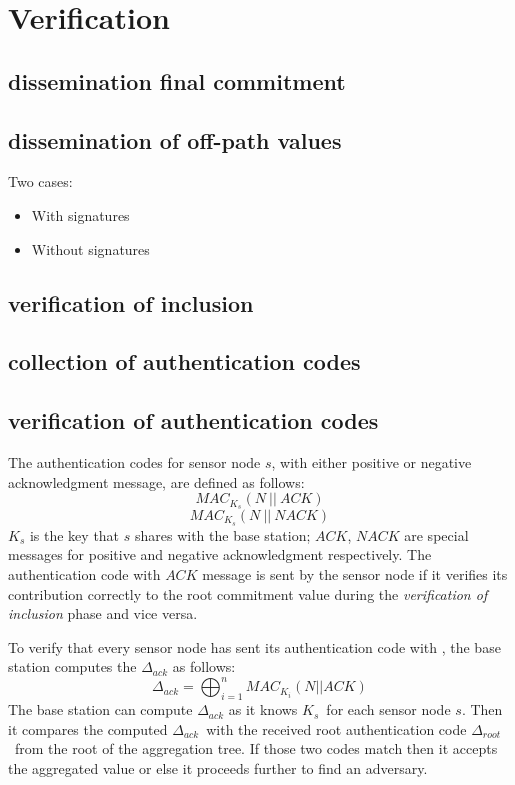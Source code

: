 \chapter{Verification}


\section{dissemination final commitment}
\section{dissemination of off-path values}
	Two cases:
	\begin{itemize}
		\item {With signatures}
		\item {Without signatures}
	\end{itemize}
\section{verification of inclusion}
\section{collection of authentication codes}
\section{verification of authentication codes}
	The authentication codes for sensor node $s$, with either positive or negative acknowledgment message, are defined as follows:
	\begin{equation}
		MAC_{K_{s}}(N\ ||\ \textit{ACK})
	\end{equation}
	\begin{equation}
		MAC_{K_{s}}(N\ ||\ \textit{NACK})
	\end{equation}
	$K_{s}$ is the key that $s$ shares with the base station;
	$\textit{ACK}$, $\textit{NACK}$ are special messages for positive and negative acknowledgment respectively.
	The authentication code with $\textit{ACK}$ message is sent by the sensor node if it verifies its contribution correctly to the root commitment value during the 
	\textit{verification of inclusion} phase and vice versa.
	
	To verify that every sensor node has sent its authentication code with \ack, the base station computes the $\Delta_{ack}$ as follows:
	\begin{equation}
		\displaystyle{\Delta_{ack} = \bigoplus_{i = 1}^n MAC_{K_{i}}(N || ACK) }
	\end{equation}
	The base station can compute $\Delta_{ack}$ as it knows $K_{s}$\ for each sensor node $s$.
	Then it compares the computed $\Delta_{ack}$\ with the received root authentication code $\Delta_{root}$\ from the root of the aggregation tree. 
	If those two codes match then it accepts the aggregated value or else it proceeds further to find an adversary. 

